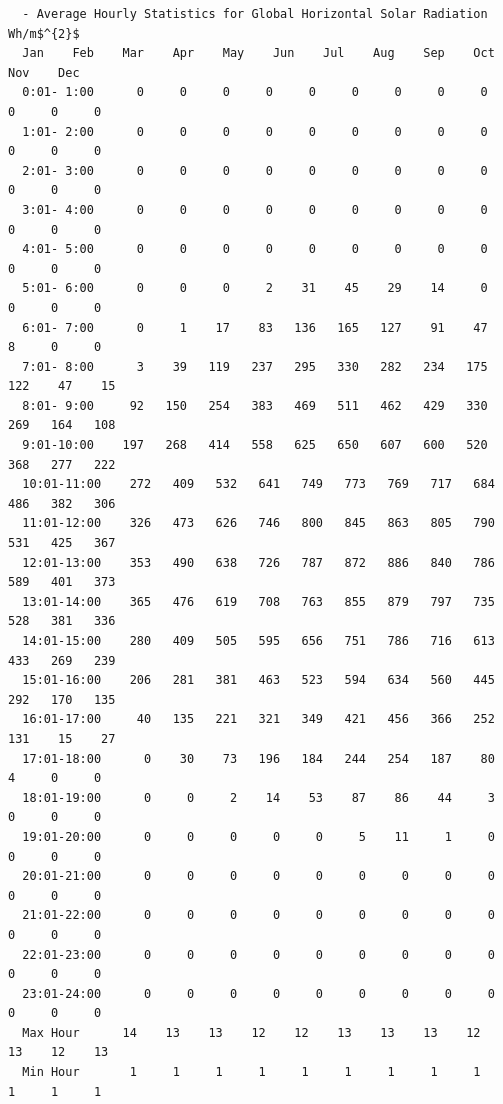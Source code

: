 \begin{lstlisting}
  - Average Hourly Statistics for Global Horizontal Solar Radiation Wh/m$^{2}$
  Jan    Feb    Mar    Apr    May    Jun    Jul    Aug    Sep    Oct    Nov    Dec   
  0:01- 1:00      0     0     0     0     0     0     0     0     0     0     0     0 
  1:01- 2:00      0     0     0     0     0     0     0     0     0     0     0     0 
  2:01- 3:00      0     0     0     0     0     0     0     0     0     0     0     0 
  3:01- 4:00      0     0     0     0     0     0     0     0     0     0     0     0 
  4:01- 5:00      0     0     0     0     0     0     0     0     0     0     0     0 
  5:01- 6:00      0     0     0     2    31    45    29    14     0     0     0     0 
  6:01- 7:00      0     1    17    83   136   165   127    91    47     8     0     0 
  7:01- 8:00      3    39   119   237   295   330   282   234   175   122    47    15 
  8:01- 9:00     92   150   254   383   469   511   462   429   330   269   164   108 
  9:01-10:00    197   268   414   558   625   650   607   600   520   368   277   222 
  10:01-11:00    272   409   532   641   749   773   769   717   684   486   382   306 
  11:01-12:00    326   473   626   746   800   845   863   805   790   531   425   367 
  12:01-13:00    353   490   638   726   787   872   886   840   786   589   401   373 
  13:01-14:00    365   476   619   708   763   855   879   797   735   528   381   336 
  14:01-15:00    280   409   505   595   656   751   786   716   613   433   269   239 
  15:01-16:00    206   281   381   463   523   594   634   560   445   292   170   135 
  16:01-17:00     40   135   221   321   349   421   456   366   252   131    15    27 
  17:01-18:00      0    30    73   196   184   244   254   187    80     4     0     0 
  18:01-19:00      0     0     2    14    53    87    86    44     3     0     0     0 
  19:01-20:00      0     0     0     0     0     5    11     1     0     0     0     0 
  20:01-21:00      0     0     0     0     0     0     0     0     0     0     0     0 
  21:01-22:00      0     0     0     0     0     0     0     0     0     0     0     0 
  22:01-23:00      0     0     0     0     0     0     0     0     0     0     0     0 
  23:01-24:00      0     0     0     0     0     0     0     0     0     0     0     0 
  Max Hour      14    13    13    12    12    13    13    13    12    13    12    13  
  Min Hour       1     1     1     1     1     1     1     1     1     1     1     1  


\end{lstlisting}
